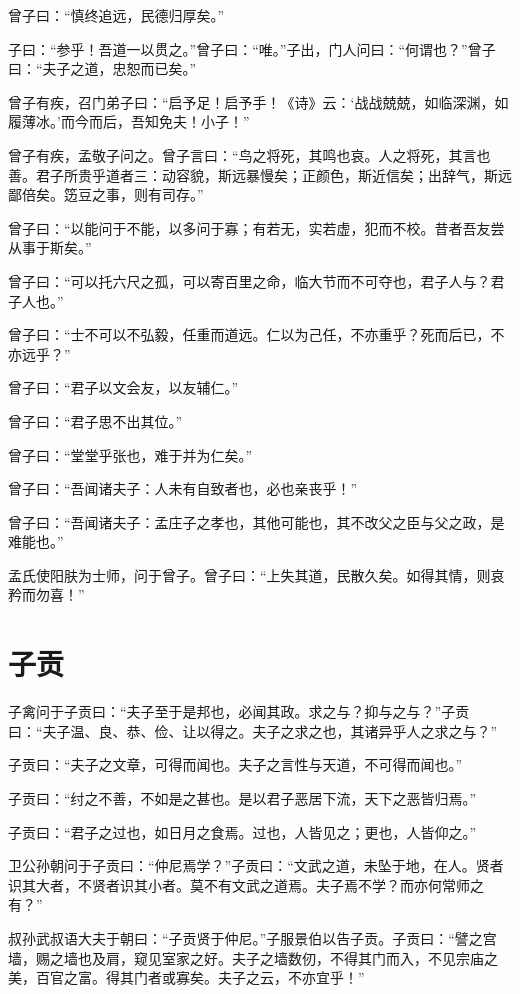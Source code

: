 \documentclass[a5paper]{ctexbook}
\begin{document}
    曾子曰：“慎终追远，民德归厚矣。”

    子曰：“参乎！吾道一以贯之。”曾子曰：“唯。”子出，门人问曰：“何谓也？”曾子曰：“夫子之道，忠恕而已矣。”

    曾子有疾，召门弟子曰：“启予足！启予手！《诗》云：‘战战兢兢，如临深渊，如履薄冰。’而今而后，吾知免夫！小子！”

    曾子有疾，孟敬子问之。曾子言曰：“鸟之将死，其鸣也哀。人之将死，其言也善。君子所贵乎道者三：动容貌，斯远暴慢矣；正颜色，斯近信矣；出辞气，斯远鄙倍矣。笾豆之事，则有司存。”

    曾子曰：“以能问于不能，以多问于寡；有若无，实若虚，犯而不校。昔者吾友尝从事于斯矣。”
    
    曾子曰：“可以托六尺之孤，可以寄百里之命，临大节而不可夺也，君子人与？君子人也。”
    
    曾子曰：“士不可以不弘毅，任重而道远。仁以为己任，不亦重乎？死而后已，不亦远乎？”

    曾子曰：“君子以文会友，以友辅仁。”
    
    曾子曰：“君子思不出其位。”

    曾子曰：“堂堂乎张也，难于并为仁矣。”
    
    曾子曰：“吾闻诸夫子：人未有自致者也，必也亲丧乎！”
    
    曾子曰：“吾闻诸夫子：孟庄子之孝也，其他可能也，其不改父之臣与父之政，是难能也。”

    孟氏使阳肤为士师，问于曾子。曾子曰：“上失其道，民散久矣。如得其情，则哀矜而勿喜！”

    \chapter{子贡}

    子禽问于子贡曰：“夫子至于是邦也，必闻其政。求之与？抑与之与？”子贡曰：“夫子温、良、恭、俭、让以得之。夫子之求之也，其诸异乎人之求之与？”

    子贡曰：“夫子之文章，可得而闻也。夫子之言性与天道，不可得而闻也。”

    子贡曰：“纣之不善，不如是之甚也。是以君子恶居下流，天下之恶皆归焉。”
    
    子贡曰：“君子之过也，如日月之食焉。过也，人皆见之；更也，人皆仰之。”
    
    卫公孙朝问于子贡曰：“仲尼焉学？”子贡曰：“文武之道，未坠于地，在人。贤者识其大者，不贤者识其小者。莫不有文武之道焉。夫子焉不学？而亦何常师之有？”

    叔孙武叔语大夫于朝曰：“子贡贤于仲尼。”子服景伯以告子贡。子贡曰：“譬之宫墙，赐之墙也及肩，窥见室家之好。夫子之墙数仞，不得其门而入，不见宗庙之美，百官之富。得其门者或寡矣。夫子之云，不亦宜乎！”
\end{document}
